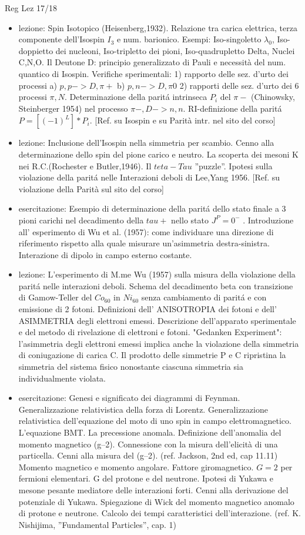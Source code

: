 \begin{frame}[allowframebreaks]{Reg Lez 17/18}
\begin{itemize}
\item lezione: Spin Isotopico (Heisenberg,1932). Relazione tra carica elettrica, terza componente dell'Isospin $I_3$ e num. barionico. Esempi: Iso-singoletto $\lambda_0$, Iso-doppietto dei nucleoni, Iso-tripletto dei pioni, Iso-quadrupletto Delta, Nuclei C,N,O. Il Deutone D: principio generalizzato di Pauli e necessità del num. quantico di Isospin. Verifiche sperimentali: 1) rapporto delle sez. d'urto dei processi a) $p,p->D,\pi+$ b) $p,n->D,\pi0$ 2) rapporti delle sez. d'urto dei 6 processi $\pi,N$. Determinazione della parit\'a intrinseca $P_i$ del $\pi-$ (Chinowsky, Steinberger 1954) nel processo $\pi-,D->n,n$. RI-definizione della parit\'a $P=[(-1)^L]*P_i$. [Ref. su Isospin e su Parità intr. nel sito del corso]
\item lezione: Inclusione dell'Isospin nella simmetria per scambio. Cenno alla determinazione dello spin del pione carico e neutro. La scoperta dei mesoni K nei R.C.(Rochester e Butler,1946). Il $teta-Tau$ ''puzzle''. Ipotesi sulla violazione della parit\'a nelle Interazioni deboli di Lee,Yang 1956. [Ref. su violazione della Parità sul sito del corso]
\item esercitazione: Esempio di determinazione della parit\'a dello stato finale a 3 pioni carichi nel decadimento della $tau+$ nello stato $J^P=0^-$ . Introduzione all' esperimento di Wu et al. (1957): come individuare una direzione di riferimento rispetto alla quale misurare un'asimmetria destra-sinistra. Interazione di dipolo in campo esterno costante.
\item lezione: L'esperimento di M.me Wu (1957) sulla misura della violazione della parit\'a nelle interazioni deboli. Schema del decadimento beta con transizione di Gamow-Teller del $Co_{60}$ in $Ni_{60}$ senza cambiamento di parit\'a e con emissione di 2 fotoni. Definizioni dell' ANISOTROPIA dei fotoni e dell' ASIMMETRIA degli elettroni emessi. Descrizione dell'apparato sperimentale e del metodo di rivelazione di elettroni e fotoni. "Gedanken Experiment": l'asimmetria degli elettroni emessi implica anche la violazione della simmetria di coniugazione di carica C. Il prodotto delle simmetrie P e C ripristina la simmetria del sistema fisico nonostante ciascuna simmetria sia individualmente violata.
\item esercitazione: Genesi e significato dei diagrammi di Feynman. Generalizzazione relativistica della forza di Lorentz. Generalizzazione relativistica dell'equazione del moto di uno spin in campo elettromagnetico. L'equazione BMT. La precessione anomala. Definizione dell'anomalia del momento magnetico (g–2). Connessione con la misura dell'elicità di una particella. Cenni alla misura del (g–2). (ref. Jackson, 2nd ed, cap 11.11) Momento magnetico e momento angolare. Fattore giromagnetico. $G=2$ per fermioni elementari. G del protone e del neutrone. Ipotesi di Yukawa e mesone pesante mediatore delle interazioni forti. Cenni alla derivazione del potenziale di Yukawa. Spiegazione di Wick del momento magnetico anomalo di protone e neutrone. Calcolo dei tempi caratteristici dell'interazione. (ref. K. Nishijima, ''Fundamental Particles'', cap. 1)

\end{itemize}
\end{frame}
